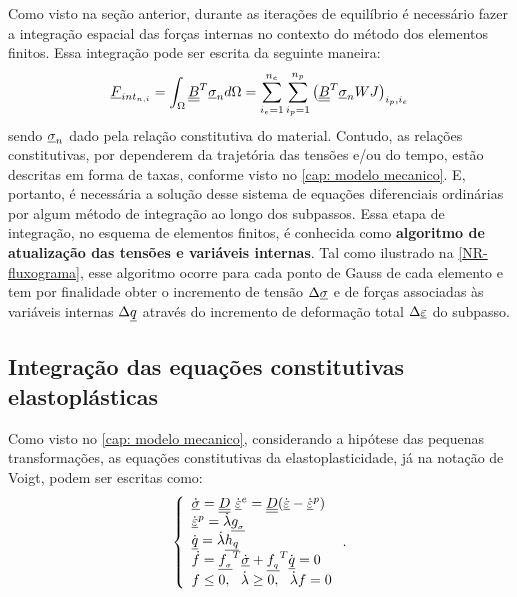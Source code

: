 Como visto na seção anterior, durante as iterações de equilíbrio é necessário fazer a integração espacial das forças internas no contexto do método dos elementos finitos. Essa integração pode ser escrita da seguinte maneira:
\begin{equation}
	\label{eq:Fint}
	\underline{F}_{int_{n,i}} = \int_{\Omega}\underline{\underline B}^T\underline \sigma_{n}d\Omega = \sum_{i_e=1}^{n_e}\sum_{i_p=1}^{n_p}\left( \underline{\underline B}^T\underline \sigma_{n}WJ\right)_{i_p,i_e}
\end{equation}
sendo $\underline \sigma_{n}$ dado pela relação constitutiva do material. Contudo, as relações constitutivas, por dependerem da trajetória das tensões e/ou do tempo, estão descritas em forma de taxas, conforme visto no \autoref{cap: modelo mecanico}. E, portanto, é necessária a solução desse sistema de equações diferenciais ordinárias por algum método de integração ao longo dos subpassos. Essa etapa de integração, no esquema de elementos finitos, é conhecida como \textbf{algoritmo de atualização das tensões e variáveis internas}. Tal como ilustrado na \autoref{NR-fluxograma}, esse algoritmo ocorre para cada ponto de Gauss de cada elemento e tem por finalidade obter o incremento de tensão $\Delta \underline \sigma$ e de forças associadas às variáveis internas $\Delta \underline q$ através do incremento de deformação total $\Delta \underline{\varepsilon}$ do subpasso.

\subsection{Integração das equações constitutivas elastoplásticas}

Como visto no \autoref{cap: modelo mecanico}, considerando a hipótese das pequenas transformações, as equações constitutivas da elastoplasticidade, já na notação de Voigt, podem ser escritas como:
\begin{equation}
	\label{eq:constitutiva_ep}
	\left\{
	\begin{array}{lcl}
		\dot {\underline \sigma} = \underline{\underline D}~\dot {\underline{\varepsilon}}^e = \underline{\underline D}(\dot {\underline{\varepsilon}} - \dot {\underline{\varepsilon}}^p) \\
		\dot {\underline{\varepsilon}}^p = \dot \lambda \underline{g_{_\sigma}} \\
		\dot {\underline q} = \dot \lambda \underline{h_q} \\
		\dot f = \underline{f_{_\sigma}}^T \dot {\underline \sigma} + \underline{f_{_q}}^T \dot {\underline q} = 0 \\
		f \leq 0,~~\dot \lambda \geq 0,~~\dot \lambda f = 0	
	\end{array}
	\right..
\end{equation}

